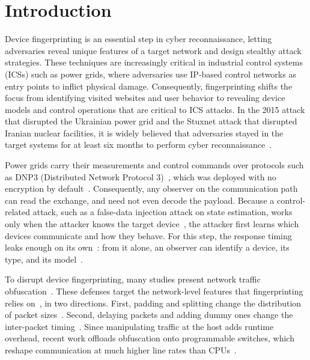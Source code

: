 \section{Introduction}

Device fingerprinting is an essential step in cyber reconnaissance, letting adversaries reveal unique
features of a target network and design stealthy attack strategies. These techniques are increasingly
critical in industrial control systems (ICSs) such as power grids, where adversaries use IP-based
control networks as entry points to inflict physical damage. Consequently, fingerprinting shifts the
focus from identifying visited websites and user behavior to revealing device models and control
operations that are critical to ICS attacks. In the 2015 attack that disrupted the Ukrainian power
grid and the Stuxnet attack that disrupted Iranian nuclear facilities, it is widely believed that
adversaries stayed in the target systems for at least six months to perform cyber
reconnaissance~\cite{leeAnalysisCyberAttack2016}.

Power grids carry their measurements and control commands over protocols such as DNP3 (Distributed
Network Protocol 3)~\cite{ieeeIEEEStandardElectric2012}, which was deployed with no encryption by
default~\cite{eastTaxonomyAttacksDNP32009}. Consequently, any observer on the communication path can read the
exchange, and need not even decode the payload. Because a control-related attack, such as a false-data
injection attack on state estimation, works only when the attacker knows the target
device~\cite{liuFalseDataInjection2009}, the attacker first learns which devices communicate and how they behave.
For this step, the response timing leaks enough on its own~\cite{formbyWhosControlYour2016}: from it alone, an
observer can identify a device, its type, and its model~\cite{kohnoRemotePhysicalDevice2005, guFingerprintingCyberPhysicalSystem2018}.

To disrupt device fingerprinting, many studies present network traffic
obfuscation~\cite{wrightTrafficMorphingEfficient2009, dyerPeekaBooStillSee2012}. These defenses target the network-level features that
fingerprinting relies on~\cite{sirinamDeepFingerprintingUndermining2018}, in two directions. First, padding and splitting change the
distribution of packet sizes~\cite{wrightTrafficMorphingEfficient2009}. Second, delaying packets and adding dummy ones change the
inter-packet timing~\cite{dyerPeekaBooStillSee2012, caiSystematicApproachDeveloping2014}. Since manipulating traffic at the host adds runtime overhead,
recent work offloads obfuscation onto programmable switches, which reshape communication at much
higher line rates than CPUs~\cite{meierDittoWANTraffic2022, wangMinosLightweightDynamic2025, xieSecuritasDefendingTraffic2026}.

